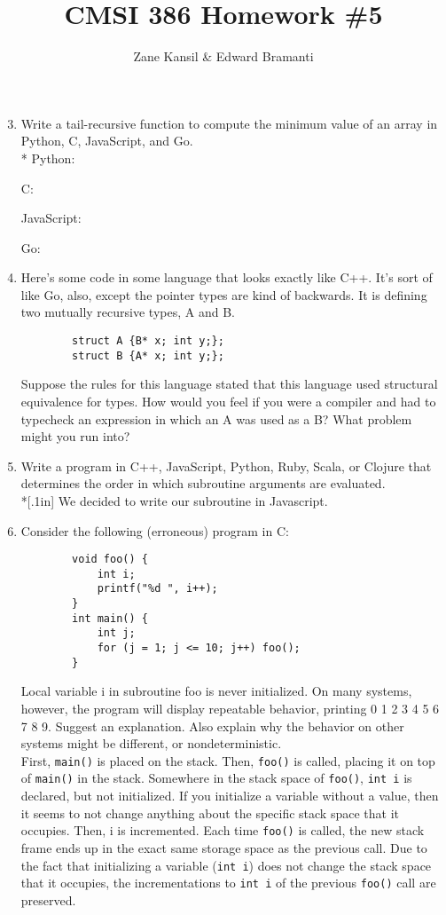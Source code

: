 \documentclass{article}
\title{CMSI 386 Homework \#5}
\author{Zane Kansil \& Edward Bramanti}
\begin{document}
\maketitle
\begin{enumerate}
	\setcounter{enumi}{2}
	\item Write a tail-recursive function to compute the minimum value of an array in Python, C, JavaScript, and Go. \\*
	\linebreak
	Python:
	
	\pagebreak
	C:
	
	\pagebreak
	JavaScript:
	
	\pagebreak
	Go:
	
	\pagebreak
	\item Here's some code in some language that looks exactly like C++. It's sort of like Go, also, except the pointer types are kind of backwards. It is defining two mutually recursive types, A and B.
	\begin{verbatim}
    	struct A {B* x; int y;};
    	struct B {A* x; int y;};
    \end{verbatim}
	Suppose the rules for this language stated that this language used structural equivalence for types. How would you feel if you were a compiler and had to typecheck an expression in which an A was used as a B? What problem might you run into?
	\pagebreak
	\item Write a program in C++, JavaScript, Python, Ruby, Scala, or Clojure that determines the order in which subroutine arguments are evaluated.\\*[.1in]
	We decided to write our subroutine in Javascript.
	
	\pagebreak
	\item Consider the following (erroneous) program in C:
	\begin{verbatim}
		void foo() {
		    int i;
		    printf("%d ", i++);
		}
		int main() {
		    int j;
		    for (j = 1; j <= 10; j++) foo();
		}
	\end{verbatim}
	Local variable i in subroutine foo is never initialized. On many systems, however, the program will display repeatable behavior, printing 0 1 2 3 4 5 6 7 8 9. Suggest an explanation. Also explain why the behavior on other systems might be different, or nondeterministic. \\

	First, \texttt{main()} is placed on the stack. Then, \texttt{foo()} is called, placing it on top of \texttt{main()} in the stack. Somewhere in the stack space of \texttt{foo()}, \texttt{int i} is declared, but not initialized. If you initialize a variable without a value, then it seems to not change anything about the specific stack space that it occupies. Then, i is incremented. Each time \texttt{foo()} is called, the new stack frame ends up in the exact same storage space as the previous call. Due to the fact that initializing a variable (\texttt{int i}) does not change the stack space that it occupies, the incrementations to \texttt{int i} of the previous \texttt{foo()} call are preserved. \\


\end{enumerate}
\end{document}

